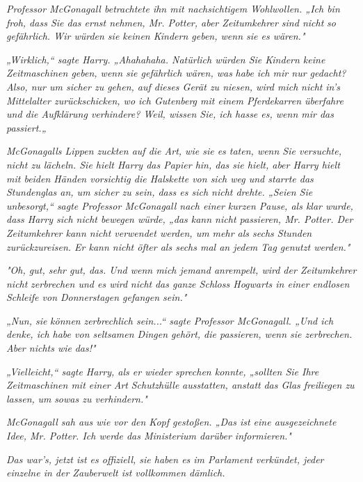 {\emph{Professor McGonagall betrachtete ihn mit nachsichtigem Wohlwollen. „Ich bin froh, dass Sie das ernst nehmen, Mr. Potter, aber Zeitumkehrer sind nicht} \emph{\emph{so}} \emph{gefährlich. Wir würden sie keinen Kindern geben, wenn sie es wären."}

\emph{„Wirklich,“ sagte Harry. „Ahahahaha. Natürlich würden Sie Kindern keine Zeitmaschinen geben, wenn sie gefährlich wären, was} \emph{\emph{habe}} \emph{ich mir nur gedacht? Also, nur um sicher zu gehen, auf dieses Gerät zu niesen, wird mich} \emph{\emph{nicht}} \emph{in's Mittelalter zurückschicken, wo ich Gutenberg mit einem Pferdekarren überfahre und die Aufklärung verhindere? Weil, wissen Sie, ich hasse es, wenn mir das passiert.„}

\emph{McGonagalls Lippen zuckten auf die Art, wie sie es taten, wenn Sie versuchte, nicht zu lächeln. Sie hielt Harry das Papier hin, das sie hielt, aber Harry hielt mit beiden Händen vorsichtig die Halskette von sich weg und starrte das Stundenglas an, um sicher zu sein, dass es sich nicht drehte. „Seien Sie unbesorgt,“ sagte Professor McGonagall nach einer kurzen Pause, als klar wurde, dass Harry sich nicht bewegen würde, „das kann nicht passieren, Mr. Potter. Der Zeitumkehrer kann nicht verwendet werden, um mehr als sechs Stunden zurückzureisen. Er kann nicht öfter als sechs mal an jedem Tag genutzt werden."}

\emph{"Oh, gut, sehr gut, das. Und wenn mich jemand anrempelt, wird der Zeitumkehrer} \emph{\emph{nicht}} \emph{zerbrechen und es wird} \emph{\emph{nicht}} \emph{das ganze Schloss Hogwarts in einer endlosen Schleife von Donnerstagen gefangen sein."}

\emph{„Nun, sie} \emph{\emph{können}} \emph{zerbrechlich sein...“ sagte Professor McGonagall. „Und ich denke, ich habe von seltsamen Dingen gehört, die passieren, wenn sie zerbrechen. Aber nichts wie} \emph{\emph{das!}"}

\emph{„Vielleicht,“ sagte Harry, als er wieder sprechen konnte, „sollten Sie Ihre Zeitmaschinen mit einer Art} \emph{\emph{Schutzhülle}} \emph{ausstatten, anstatt} \emph{\emph{das Glas freiliegen zu lassen,}} \emph{um} \emph{\emph{sowas zu verhindern.}"}

\emph{McGonagall sah aus wie vor den Kopf gestoßen. „Das ist eine ausgezeichnete Idee, Mr. Potter. Ich werde das Ministerium darüber informieren."}

\emph{\emph{Das war's, jetzt ist es offiziell, sie haben es im Parlament verkündet, jeder einzelne in der Zauberwelt ist vollkommen dämlich.}}

}
